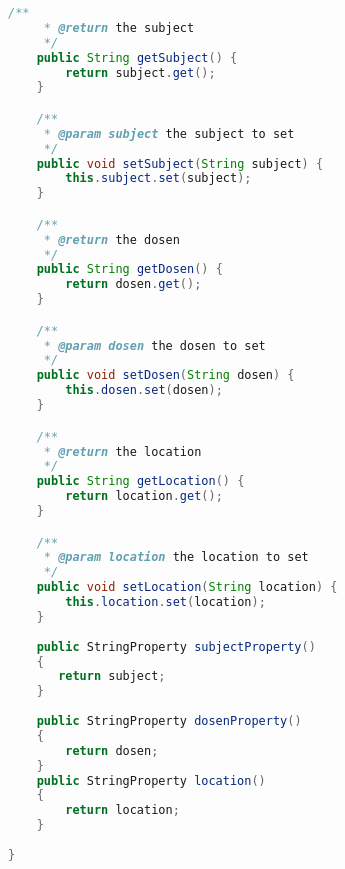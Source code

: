 \begin{lstlisting}[language=Java,basicstyle=\tiny,caption=ScheduleClass.java,label=lst:ScheduleClass]
    /**
     * @return the subject
     */
    public String getSubject() {
        return subject.get();
    }

    /**
     * @param subject the subject to set
     */
    public void setSubject(String subject) {
        this.subject.set(subject);
    }

    /**
     * @return the dosen
     */
    public String getDosen() {
        return dosen.get();
    }

    /**
     * @param dosen the dosen to set
     */
    public void setDosen(String dosen) {
        this.dosen.set(dosen);
    }

    /**
     * @return the location
     */
    public String getLocation() {
        return location.get();
    }

    /**
     * @param location the location to set
     */
    public void setLocation(String location) {
        this.location.set(location);
    }
    
    public StringProperty subjectProperty()
    {
       return subject;
    }
    
    public StringProperty dosenProperty()
    {
        return dosen;
    }
    public StringProperty location()
    {
        return location;
    }
    
}

\end{lstlisting}

